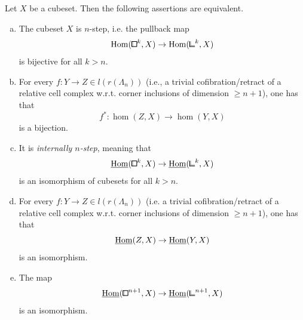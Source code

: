 \begin{proposition}\label{prop:truncations-char}
Let $X$ be a cubeset. Then the following assertions are equivalent.
\begin{enumerate}[(a)]
	\item The cubeset $X$ is $n$-step, i.e. the pullback map
	\[
        \hom({\bbox}^k,X)\to\hom({\bbcor}^k,X)
    \]
    is bijective for all $k>n$.
	\item For every $f\colon Y\to Z\in l(r(\Lambda_n))$
    (i.e., a trivial cofibration/retract of a relative cell complex w.r.t. corner inclusions of dimension $\geq n+1$),
	one has that
    \[
        f^\ast\colon\hom(Z,X)\to \hom(Y,X)
    \]
    is a bijection.
    \item It is \emph{internally $n$-step}, meaning that
	\[
        \ihom({\bbox}^k,X)\to\ihom({\bbcor}^k,X)
    \]
	is an isomorphism of cubesets for all $k>n$.
    \item For every $f\colon Y\to Z\in l(r(\Lambda_n))$
	(i.e. a trivial cofibration/retract of a relative cell complex w.r.t. corner inclusions of dimension $\geq n+1$),
    one has that
	\[
    	\underline{\operatorname{Hom}}(Z, X)\to \underline{\operatorname{Hom}}(Y,X)
	\]
	is an isomorphism.
    \item The map
	\[
        \ihom({\bbox}^{n+1},X)\to\ihom({\bbcor}^{n+1},X)
    \]
    is an isomorphism.
\end{enumerate}
\end{proposition}

